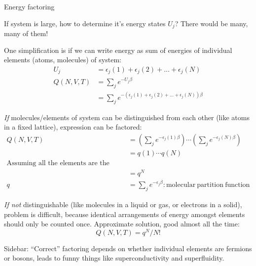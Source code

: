 \message{ !name(Outline.tex)}\documentclass[11pt]{article}
\begin{document}
\begin{outline}
\begin{outline}
\item{Energy factoring}
  \begin{outline}
  \item{If system is large, how to determine it's energy states $U_j$?  There
      would be many, many of them!}
  \item{One simplification is if we can write energy as sum of energies of
      individual elements (atoms, molecules) of system:}
    \begin{align}
      U_j&=\epsilon_j(1)+\epsilon_j(2) + ... + \epsilon_j(N) \\
      Q(N,V,T) &= \sum_j e^{-U_j\beta} \\
      &=\sum_je^{-(\epsilon_j(1)+\epsilon_j(2) + ... + \epsilon_j(N))\beta}
    \end{align}
    \begin{outline}
    \item{{\em If} molecules/elements of system can be distinguished from each
        other (like atoms in a fixed lattice), expression can be factored:}
      \begin{align}
        Q(N,V,T)&=\left ( \sum_j e^{-\epsilon_j(1)\beta}\right )\cdots \left ( \sum_j
          e^{-\epsilon_j(N)\beta}\right ) \\
      &= q(1)\cdots q(N) \\
      \text{Assuming all the elements are the same:}\\
      &= q^N \\
     q&=\sum_j e^{-\epsilon_j \beta}: \mathrm{molecular\ partition\ function}
   \end{align}
  \item{{\em If not} distinguishable (like molecules in a liquid or gas, or
      electrons in a solid), problem is difficult, because identical
      arrangements of energy amongst elements should only be counted once.
      Approximate solution, good almost all the time:}
    \begin{equation}
      Q(N,V,T)=q^N/N!
    \end{equation}
  \item{Sidebar: ``Correct'' factoring depends on whether individual elements
      are fermions or bosons, leads to funny things like superconductivity and
      superfluidity.}
  \end{outline}
\end{outline}


\end{outline}
\end{outline}
\end{document}
